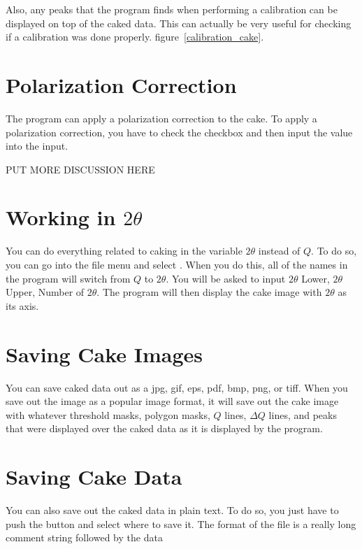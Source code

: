 Also, any peaks that the program finds when performing
a calibration can be displayed on top of the caked
data. This can actually be very useful for checking if
a calibration was done properly.
figure~\ref{calibration_cake}. 

\section{Polarization Correction}
The program can apply a polarization correction to the
cake. To apply a polarization correction, you have
to check the  checkbox
and then input the value into the  input.

PUT MORE DISCUSSION HERE

\section{\texorpdfstring{Working in $2\theta$}{Working in 2theta}}

You can do everything related to caking in the variable
$2\theta$ instead of $Q$. To do so, you can go into
the file menu and select . When you 
do this, all of the names in the program will switch 
from $Q$ to $2\theta$. You will be asked to input 
$2\theta$ Lower, $2\theta$ Upper, Number of $2\theta$. 
The program will then display the cake image with
$2\theta$ as its axis.

\section{Saving Cake Images}

You can save caked
data out as a jpg, gif, eps, pdf, bmp, png, or tiff.
When you save out the image as a popular image format, it
will save out the cake image with whatever threshold masks,
polygon masks, $Q$ lines, $\Delta Q$ lines, and peaks that
were displayed over the caked data as it is displayed by
the program.

\section{Saving Cake Data}

You can also save out the caked data in plain text. To do so,
you just have to push the  button and
select where to save it. The format of the file is a really
long comment string followed by the data 

